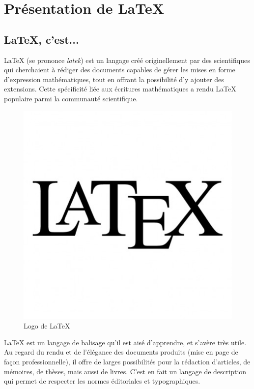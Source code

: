 
\chapter{Présentation de \LaTeX}
\section{\LaTeX, c'est...}
\LaTeX{} (se prononce \textit{latek}) est un langage créé originellement par des scientifiques qui cherchaient à rédiger des documents capables de gérer les mises en forme d'expression mathématiques, tout en offrant la possibilité d'y ajouter des extensions. Cette spécificité liée aux écritures mathématiques a rendu \LaTeX{} populaire parmi la communauté scientifique.

\begin{figure}[h]
\begin{center}
\includegraphics[scale=0.3]{IMG/LogoLaTex.jpeg}
\caption{Logo de \LaTeX}
\end{center}
\end{figure}

\LaTeX{} est un langage de balisage qu'il est aisé d'apprendre, et s'avère très utile. Au regard du rendu et de l'élégance des documents produits (mise en page de façon professionnelle), il offre de larges possibilités pour la rédaction d'articles, de mémoires, de thèses, mais aussi de livres. C'est en fait un langage de description qui permet de respecter les normes éditoriales et typographiques.
\medskip


